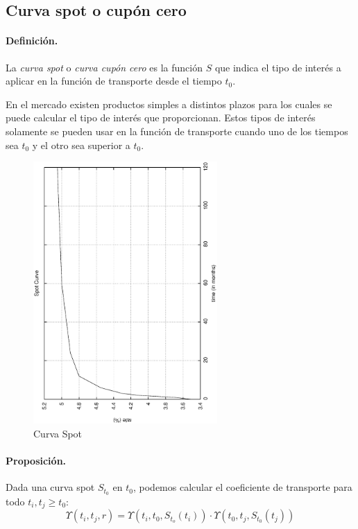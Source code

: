 \subsection{Curva spot o cup\'on cero}

\paragraph{Definici\'on.} La \emph{curva spot} o
\emph{curva cup\'on cero} es la funci\'on
$S$ que indica el tipo de inter\'es a aplicar en la funci\'on de transporte
desde el tiempo $t_0$.

En el mercado existen productos simples a distintos plazos para los cuales se 
puede calcular el tipo de inter\'es que proporcionan. Estos tipos de inter\'es
solamente se pueden usar en la funci\'on de transporte cuando uno de los
tiempos sea $t_0$ y el otro sea superior a $t_0$.

\begin{figure}[!hb]
\begin{center}
\includegraphics[height=10cm, angle=-90]{./images/spot.ps}
\caption{Curva Spot}
\label{spot}
\end{center}
\end{figure}

\paragraph{Proposici\'on.} Dada una curva spot $S_{t_0}$ en $t_0$, podemos calcular
el coeficiente de transporte para todo $t_i, t_j \ge t_0$:
\begin{equation}
\Upsilon(t_i,t_j, r) = 
\Upsilon(t_i,t_0, S_{t_o}(t_i)) \cdot \Upsilon(t_0,t_j, S_{t_0}(t_j))
\end{equation}


